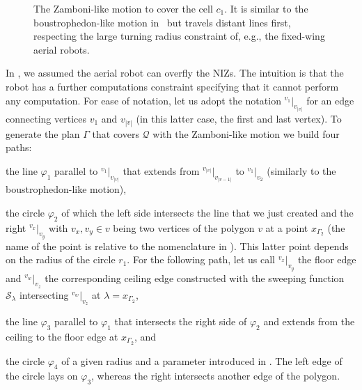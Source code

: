 \begin{figure}[h]
  \centering
  \selectfont
  
  \caption[Zamboni-like motion covering a cell]{The Zamboni-like motion to cover the cell $c_1$. It is similar to the boustrophedon-like motion in~ but travels distant lines first, respecting the large turning radius constraint of, e.g., the fixed-wing aerial robots.}
  \label{fig:zambo1}
\end{figure}
In , we assumed the aerial robot can overfly the NIZs. The intuition is that the robot has a further computations constraint specifying that it cannot perform any computation. For ease of notation, let us adopt the notation ${}^{v_1}|_{v_{|v|}}$ for an edge connecting vertices $v_1$ and $v_{|v|}$ (in this latter case, the first and last vertex). To generate the plan $\Gamma$ that covers $\mathcal{Q}$ with the Zamboni-like motion we build four paths:
\begin{enumerate*}[label={(\alph*)},font={\textit}]
  \item the line $\varphi_1$ parallel to ${}^{v_1}|_{v_{|v|}}$ that extends from ${}^{v_{|v|}}|_{v_{|v-1|}}$ to ${}^{v_{1}}|_{v_{2}}$ (similarly to the boustrophedon-like motion),
  \item the circle $\varphi_2$ of which the left side intersects the line that we just created and the right ${}^{v_x}|_{v_y}$ with $v_x,v_y\in v$ being two vertices of the polygon $v$ at a point $x_{\Gamma_2}$ (the name of the point is relative to the nomenclature in ). This latter point depends on the radius of the circle $r_1$. For the following path, let us call ${}^{v_x}|_{v_y}$ the floor edge and ${}^{v_w}|_{v_z}$ the corresponding ceiling edge constructed with the sweeping function $\mathcal{S}_{\lambda}$ intersecting  ${}^{v_w}|_{v_z}$ at $\lambda=x_{\Gamma_2}$,
  \item the line $\varphi_3$ parallel to $\varphi_1$ that intersects the right side of $\varphi_2$ and extends from the ceiling to the floor edge at $x_{\Gamma_2}$, and
  \item the circle $\varphi_4$ of a given radius and a parameter introduced in . The left edge of the circle lays on $\varphi_3$, whereas the right intersects another edge of the polygon. 
\end{enumerate*}
